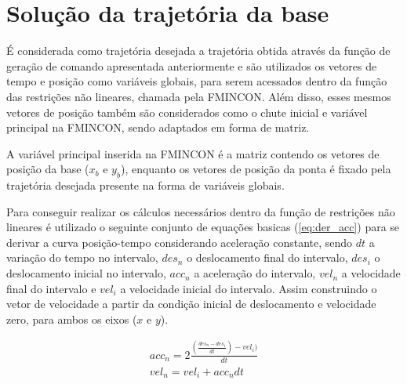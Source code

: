 \section{Solução da trajetória da base}

É considerada como trajetória desejada a trajetória obtida através da função de geração de comando apresentada anteriormente
e são utilizados os vetores de tempo e posição como variáveis globais, para serem acessados dentro da função das
restrições não lineares, chamada pela FMINCON.
Além disso, esses mesmos vetores de posição também são considerados como o chute inicial e variável principal
na FMINCON, sendo adaptados em forma de matriz.

A variável principal inserida na FMINCON é a matriz contendo os vetores de posição da base ($x_b$ e $y_b$),
enquanto os vetores de posição da ponta é fixado pela trajetória desejada presente na forma de variáveis globais.

Para conseguir realizar os cálculos necessários dentro da função de restrições não lineares é utilizado o seguinte conjunto
de equações basicas (\ref{eq:der_acc}) para se derivar a curva posição-tempo considerando aceleração constante,
sendo $dt$ a variação do tempo no intervalo, $des_n$ o deslocamento final do intervalo, $des_i$ o deslocamento inicial no intervalo,
$acc_n$ a aceleração do intervalo, $vel_n$ a velocidade final do intervalo e $vel_i$ a velocidade inicial do intervalo.
Assim construindo o vetor de velocidade a partir da condição inicial de deslocamento e velocidade zero, para ambos os eixos ($x$ e $y$).

\begin{equation}
    \label{eq:der_acc}
    \begin{split}        
        acc_n = 2\frac{(\frac{des_n-des_i}{dt})-vel_i)}{dt} \\
        vel_n = vel_i+acc_ndt \\
    \end{split}
\end{equation}
